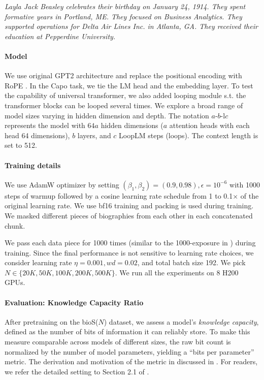 \documentclass[]{bytedance_seed}
\newcommand{\1}{\mathbf{1}}
\newcommand{\ut}{LoopLM}
\begin{document}
\begin{center}
    \emph{Layla Jack Beasley celebrates their birthday on January 24, 1914. They spent formative years in Portland, ME. They focused on Business Analytics. They supported operations for Delta Air Lines Inc. in Atlanta, GA. They received their education at Pepperdine University.}
\end{center}

\paragraph{Model} We use original GPT2 architecture and replace the positional encoding with RoPE \cite{su2023roformerenhancedtransformerrotary}. In the Capo task, we tie the LM head and the embedding layer. To test the capability of universal transformer, we also added looping module s.t. the transformer blocks can be looped several times. We explore a broad range of model sizes varying in hidden dimension and depth. The notation $a$-$b$-l$c$ represents the model with $64a$ hidden dimensions ($a$ attention heads with each head 64 dimensions), $b$ layers, and $c$ \ut{} steps (loops). The context length is set to 512. 

\paragraph{Training details} We use AdamW optimizer by setting $(\beta_1,\beta_2)=(0.9,0.98), \epsilon=10^{-6}$ with 1000 steps of warmup followed by a cosine learning rate schedule from 1 to 0.1$\times$ of the original learning rate. We use bf16 training and packing is used during training. We masked different pieces of biographies from each other in each concatenated chunk.

We pass each data piece for 1000 times (similar to the 1000-exposure in \cite{AL2024-knowledge3}) during training. Since the final performance is not sensitive to learning rate choices, we consider learning rate $\eta = 0.001, wd=0.02$, and total batch size 192. We pick $N\in\{20K, 50K, 100K, 200K, 500K\}$. We run all the experiments on 8 H200 GPUs.

\paragraph{Evaluation: Knowledge Capacity Ratio} 
After pretraining on the bioS($N$) dataset, we assess a model’s \emph{knowledge capacity}, 
defined as the number of bits of information it can reliably store. To make this measure 
comparable across models of different sizes, the raw bit count is normalized by the number 
of model parameters, yielding a ``bits per parameter'' metric. 
The derivation and motivation of the metric in discussed in \cite{AL2024-knowledge3}. For readers, we refer the detailed setting to Section 2.1 of \cite{AL2024-knowledge3}.
\end{document}
